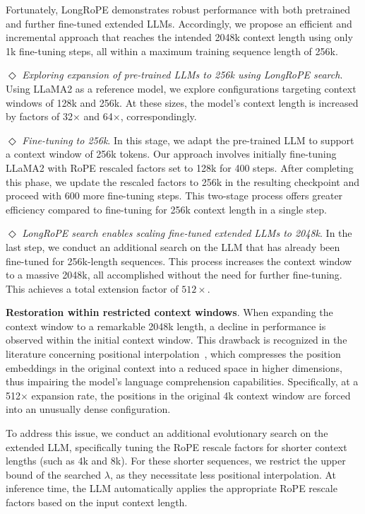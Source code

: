Fortunately, LongRoPE demonstrates robust performance with both pretrained and further fine-tuned extended LLMs. Accordingly, we propose an efficient and incremental approach that reaches the intended 2048k context length using only 1k fine-tuning steps, all within a maximum training sequence length of 256k.

$\Diamond$ \textit{Exploring expansion of pre-trained LLMs to 256k using LongRoPE search}. Using LLaMA2 as a reference model, we explore configurations targeting context windows of 128k and 256k. At these sizes, the model’s context length is increased by factors of 32$\times$ and 64$\times$, correspondingly.

$\Diamond$ \textit{Fine-tuning to 256k}. In this stage, we adapt the pre-trained LLM to support a context window of 256k tokens. Our approach involves initially fine-tuning LLaMA2 with RoPE rescaled factors set to 128k for 400 steps. After completing this phase, we update the rescaled factors to 256k in the resulting checkpoint and proceed with 600 more fine-tuning steps. This two-stage process offers greater efficiency compared to fine-tuning for 256k context length in a single step.

$\Diamond$ \textit{LongRoPE search enables scaling fine-tuned extended LLMs to 2048k}. In the last step, we conduct an additional search on the LLM that has already been fine-tuned for 256k-length sequences. This process increases the context window to a massive 2048k, all accomplished without the need for further fine-tuning. This achieves a total extension factor of $512\times$.

\textbf{Restoration within restricted context windows}.  When expanding the context window to a remarkable 2048k length, a decline in performance is observed within the initial context window. This drawback is recognized in the literature concerning positional interpolation~\cite{pi}, which compresses the position embeddings in the original context into a reduced space in higher dimensions, thus impairing the model's language comprehension capabilities. Specifically, at a 512$\times$ expansion rate, the positions in the original 4k context window are forced into an unusually dense configuration.

To address this issue, we conduct an additional evolutionary search on the extended LLM, specifically tuning the RoPE rescale factors for shorter context lengths (such as 4k and 8k). For these shorter sequences, we restrict the upper bound of the searched $\lambda$, as they necessitate less positional interpolation. At inference time, the LLM automatically applies the appropriate RoPE rescale factors based on the input context length.


